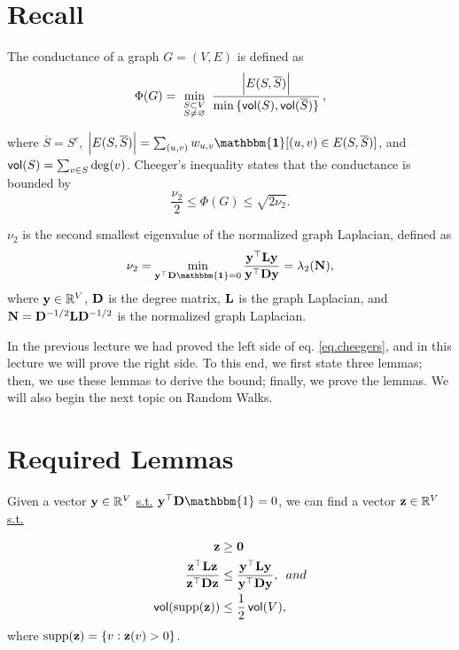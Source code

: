 \documentclass[11pt]{article}
\begin{document}
\newcommand{\coursenum}{{CSC 2421H}}
\newcommand{\coursename}{{Graphs, Matrices, and Optimization}}
\newcommand{\courseprof}{Sushant Sachdeva}


\section{Recall}

The conductance of a graph $G = (V,E)$ is defined as 
\begin{equation}
\Phi(G) = \ \min_{\substack{ S \subset V \\ S \neq \varnothing}} \  \dfrac{\left| E(S,\overline{S}) \right|}{\min{\{\operatorname{\mathsf{vol}}(S),\operatorname{\mathsf{vol}}(\overline{S})\}}} \,,
\end{equation}

where $\overline{S} = S^c$, $\abs{E(S,\overline{S})} = \sum_{(u,v)} w_{u,v}\V{\mathbbm{1}}[(u,v) \in E(S,\overline{S}) ]$, and $\operatorname{\mathsf{vol}}(S) = \sum_{v \in S} \text{deg}(v)$. Cheeger's inequality states that the conductance is bounded by
\begin{equation} \label{eq.cheegers}
\frac{\nu_2}{2} \leq \Phi(G) \leq \sqrt{2\nu_2}.
\end{equation}

$\nu_2$ is the second smallest eigenvalue of the normalized graph Laplacian, defined as 
\begin{equation}
\nu_2 = \min_{\V{y}^{\top}\V{D}\V{\mathbbm{1}}=0} \dfrac{\V{y}^{\top}\V{L}\V{y}}{\V{y}^{\top}\V{D}\V{y}} = \lambda_2(\V{N}),
\end{equation}
where $\V{y} \in\mathbb{R}^V$, $\V{D}$ is the degree matrix, $\V{L}$ is the graph Laplacian, and $\V{N}=\V{D}^{-1/2}\V{L}\V{D}^{-1/2}$ is the normalized graph Laplacian.

In the previous lecture we had proved the left side of eq. \ref{eq.cheegers}, and in this lecture we will prove the right side. To this end, we first state three lemmas; then, we use these lemmas to derive the bound; finally, we prove the lemmas. We will also begin the next topic on Random Walks.

\section{Required Lemmas}

\begin{lemma} \label{lem1}
Given a vector $\V{y} \in \mathbb{R}^V$ \underline{s.t.} $\V{y}^{\top}\V{D}\mathbbm{1}=0$, we can find a vector $\V{z} \in \mathbb{R}^V$ \underline{s.t.}

\begin{align*}
\V{z} &\geq \V{0} \\
\dfrac{\V{z}^{\top}\V{L}\V{z}}{\V{z}^{\top}\V{D}\V{z}} &\leq \dfrac{\V{y}^{\top}\V{L}\V{y}}{\V{y}^{\top}\V{D}\V{y}}, \,\,\, and \\
\vol(\mathrm{supp}(\V{z})) &\leq \frac{1}{2} \vol(V),
\end{align*}
where $\mathrm{supp}(\V{z}) = \{ v : \V{z}(v) > 0 \}$.
\end{lemma}
\end{document}
